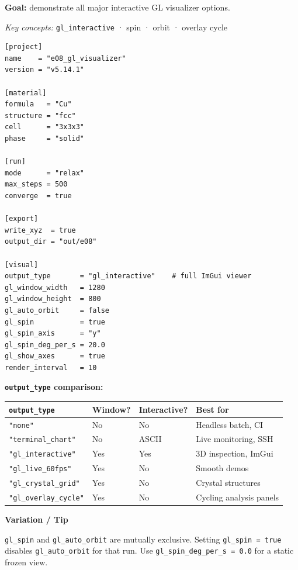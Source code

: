 \documentclass[11pt,a4paper]{article}
\newenvironment{tip}{%
  \begin{tcolorbox}[tipbox]%
  \textbf{\color{vsimgreen}Variation / Tip\quad}%
}{%
  \end{tcolorbox}%
}
\begin{document}
\textbf{Goal:} demonstrate all major interactive GL visualizer options.

\textit{Key concepts:} \texttt{gl\_interactive} · spin · orbit · overlay cycle

\begin{tcolorbox}[scriptbox, scriptheader, title={e08\_gl\_visualizer.vsim}]
\begin{lstlisting}[style=vsimlst]
[project]
name    = "e08_gl_visualizer"
version = "v5.14.1"

[material]
formula   = "Cu"
structure = "fcc"
cell      = "3x3x3"
phase     = "solid"

[run]
mode      = "relax"
max_steps = 500
converge  = true

[export]
write_xyz  = true
output_dir = "out/e08"

[visual]
output_type       = "gl_interactive"    # full ImGui viewer
gl_window_width   = 1280
gl_window_height  = 800
gl_auto_orbit     = false
gl_spin           = true
gl_spin_axis      = "y"
gl_spin_deg_per_s = 20.0
gl_show_axes      = true
render_interval   = 10
\end{lstlisting}
\end{tcolorbox}

\noindent\textbf{\texttt{output\_type} comparison:}

\begin{center}
\footnotesize
\begin{tabular}{@{}llll@{}}
\toprule
\texttt{output\_type} & Window? & Interactive? & Best for \\
\midrule
\texttt{"none"}              & No  & No      & Headless batch, CI \\
\texttt{"terminal\_chart"}   & No  & ASCII   & Live monitoring, SSH \\
\texttt{"gl\_interactive"}   & Yes & Yes     & 3D inspection, ImGui \\
\texttt{"gl\_live\_60fps"}   & Yes & No      & Smooth demos \\
\texttt{"gl\_crystal\_grid"} & Yes & No      & Crystal structures \\
\texttt{"gl\_overlay\_cycle"}& Yes & No      & Cycling analysis panels \\
\bottomrule
\end{tabular}
\end{center}

\begin{tip}
\texttt{gl\_spin} and \texttt{gl\_auto\_orbit} are mutually exclusive.
Setting \texttt{gl\_spin = true} disables \texttt{gl\_auto\_orbit} for that run.
Use \texttt{gl\_spin\_deg\_per\_s = 0.0} for a static frozen view.
\end{tip}
\end{document}
